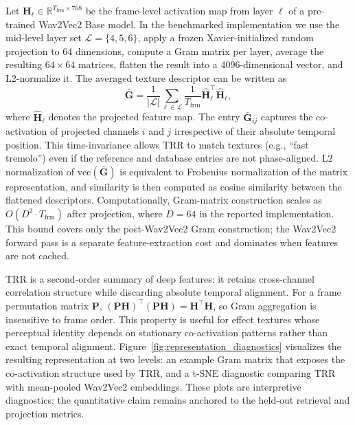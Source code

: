Let $\mathbf{H}_{\ell} \in \mathbb{R}^{T_{\text{frm}} \times 768}$ be the frame-level activation map from layer $\ell$ of a pre-trained Wav2Vec2 Base model. In the benchmarked implementation we use the mid-level layer set $\mathcal{L}=\{4,5,6\}$, apply a frozen Xavier-initialized random projection to 64 dimensions, compute a Gram matrix per layer, average the resulting $64\times 64$ matrices, flatten the result into a 4096-dimensional vector, and L2-normalize it. The averaged texture descriptor can be written as
\begin{equation}
		\bar{\mathbf{G}} = \frac{1}{|\mathcal{L}|}\sum_{\ell\in\mathcal{L}} \frac{1}{T_{\text{frm}}}\widehat{\mathbf{H}}_{\ell}^{\top}\widehat{\mathbf{H}}_{\ell},
\end{equation}
where $\widehat{\mathbf{H}}_{\ell}$ denotes the projected feature map. The entry $\bar{\mathbf{G}}_{ij}$ captures the co-activation of projected channels $i$ and $j$ irrespective of their absolute temporal position. This time-invariance allows TRR to match textures (e.g., ``fast tremolo'') even if the reference and database entries are not phase-aligned. L2 normalization of $\mathrm{vec}(\bar{\mathbf{G}})$ is equivalent to Frobenius normalization of the matrix representation, and similarity is then computed as cosine similarity between the flattened descriptors. Computationally, Gram-matrix construction scales as $O(D^2 \cdot T_{\text{frm}})$ after projection, where $D=64$ in the reported implementation. This bound covers only the post-Wav2Vec2 Gram construction; the Wav2Vec2 forward pass is a separate feature-extraction cost and dominates when features are not cached.

TRR is a second-order summary of deep features: it retains cross-channel correlation structure while discarding absolute temporal alignment. For a frame permutation matrix $\mathbf{P}$, $(\mathbf{P}\mathbf{H})^\top(\mathbf{P}\mathbf{H})=\mathbf{H}^\top\mathbf{H}$, so Gram aggregation is insensitive to frame order. This property is useful for effect textures whose perceptual identity depends on stationary co-activation patterns rather than exact temporal alignment. Figure~\ref{fig:representation_diagnostics} visualizes the resulting representation at two levels: an example Gram matrix that exposes the co-activation structure used by TRR, and a t-SNE diagnostic comparing TRR with mean-pooled Wav2Vec2 embeddings. These plots are interpretive diagnostics; the quantitative claim remains anchored to the held-out retrieval and projection metrics.

